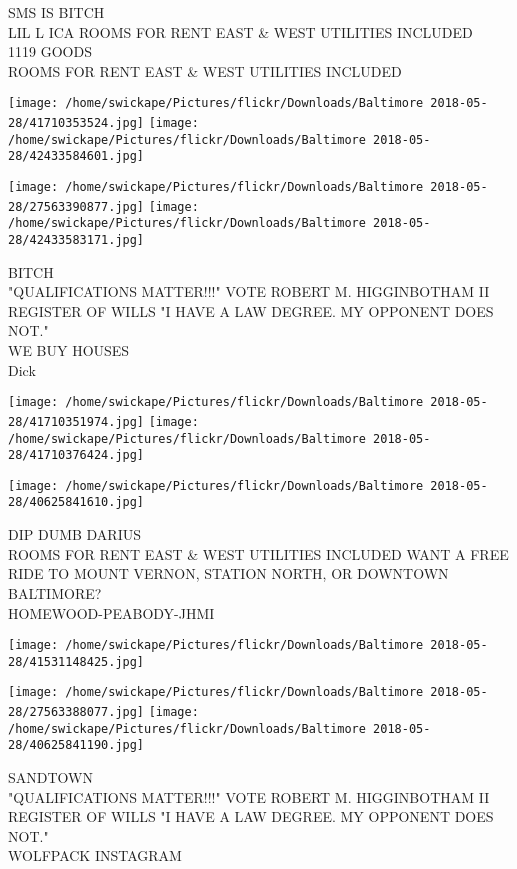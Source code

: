 \documentclass[10pt,letterpaper]{article}
\begin{document}
SMS IS BITCH\\
LIL L ICA ROOMS FOR RENT EAST \& WEST UTILITIES INCLUDED\\
1119 GOODS\\
ROOMS FOR RENT EAST \& WEST UTILITIES INCLUDED\\
\pagebreak

\texttt{[image: /home/swickape/Pictures/flickr/Downloads/Baltimore 2018-05-28/41710353524.jpg]}
\texttt{[image: /home/swickape/Pictures/flickr/Downloads/Baltimore 2018-05-28/42433584601.jpg]}

\texttt{[image: /home/swickape/Pictures/flickr/Downloads/Baltimore 2018-05-28/27563390877.jpg]}
\texttt{[image: /home/swickape/Pictures/flickr/Downloads/Baltimore 2018-05-28/42433583171.jpg]}

BITCH\\
"QUALIFICATIONS MATTER!!!" VOTE ROBERT M. HIGGINBOTHAM II REGISTER OF WILLS "I HAVE A LAW DEGREE.  MY OPPONENT DOES NOT."\\
WE BUY HOUSES\\
Dick\\
\pagebreak

\texttt{[image: /home/swickape/Pictures/flickr/Downloads/Baltimore 2018-05-28/41710351974.jpg]}
\texttt{[image: /home/swickape/Pictures/flickr/Downloads/Baltimore 2018-05-28/41710376424.jpg]}

\texttt{[image: /home/swickape/Pictures/flickr/Downloads/Baltimore 2018-05-28/40625841610.jpg]}

DIP DUMB DARIUS\\
ROOMS FOR RENT EAST \& WEST UTILITIES INCLUDED WANT A FREE RIDE TO MOUNT VERNON, STATION NORTH, OR DOWNTOWN BALTIMORE?\\
HOMEWOOD{-}PEABODY{-}JHMI\\
\pagebreak

\texttt{[image: /home/swickape/Pictures/flickr/Downloads/Baltimore 2018-05-28/41531148425.jpg]}

\vspace{0.25in}
\texttt{[image: /home/swickape/Pictures/flickr/Downloads/Baltimore 2018-05-28/27563388077.jpg]}
\texttt{[image: /home/swickape/Pictures/flickr/Downloads/Baltimore 2018-05-28/40625841190.jpg]}

SANDTOWN\\
"QUALIFICATIONS MATTER!!!" VOTE ROBERT M. HIGGINBOTHAM II REGISTER OF WILLS "I HAVE A LAW DEGREE.  MY OPPONENT DOES NOT."\\
WOLFPACK INSTAGRAM\\
\pagebreak
\end{document}
